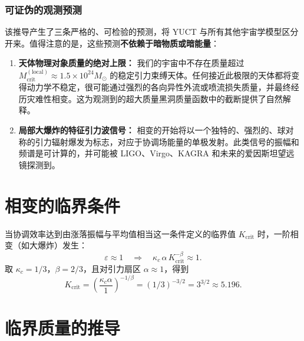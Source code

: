 \documentclass[11pt,a4paper]{article}
\newcommand{\kappac}{\kappa_c}
\newcommand{\betaf}{\beta}
\begin{document}
	\subsubsection{可证伪的观测预测}
	
	该推导产生了三条严格的、可检验的预测，将 YUCT 与所有其他宇宙学模型区分开来。值得注意的是，这些预测\textbf{不依赖于暗物质或暗能量}：
	
	\begin{enumerate}
		\item \textbf{天体物理对象质量的绝对上限：} 我们的宇宙中不存在质量超过 \(M_{\mathrm{crit}}^{\mathrm{(local)}} \approx 1.5 \times 10^{24} M_{\odot}\) 的稳定引力束缚天体。任何接近此极限的天体都将变得动力学不稳定，很可能通过强烈的各向异性外流或喷流损失质量，并最终经历灾难性相变。这为观测到的超大质量黑洞质量函数中的截断提供了自然解释。
		
		\item \textbf{局部大爆炸的特征引力波信号：} 相变的开始将以一个独特的、强烈的、球对称的引力辐射爆发为标志，对应于协调场能量的单极发射。此类信号的振幅和频谱是可计算的，并可能被 LIGO、Virgo、KAGRA 和未来的爱因斯坦望远镜探测到。
	\end{enumerate}
	
	\section{相变的临界条件}
	\label{sec:critical-condition}
	
	当协调效率达到由涨落振幅与平均值相当这一条件定义的临界值 \(K_{\mathrm{crit}}\) 时，一阶相变（如大爆炸）发生：
	\begin{equation}
		\varepsilon \approx 1 \quad \Longrightarrow \quad \kappac \, \alpha \, K_{\mathrm{crit}}^{-\betaf} \approx 1.
		\label{eq:critical-condition}
	\end{equation}
	取 \(\kappac = 1/3\)，\(\betaf = 2/3\)，且对引力扇区 \(\alpha \approx 1\)，得到
	\begin{equation}
		K_{\mathrm{crit}} = \left( \frac{\kappac \alpha}{1} \right)^{-1/\betaf} = (1/3)^{-3/2} = 3^{3/2} \approx 5.196.
		\label{eq:Kcrit}
	\end{equation}
	
	\section{临界质量的推导}
	\label{sec:derivation}
	
\end{document}
